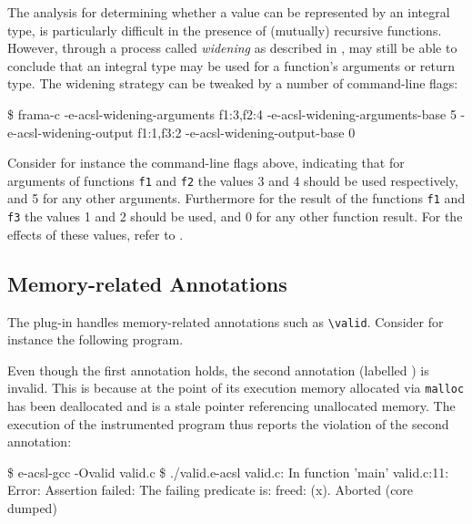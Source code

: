The analysis for determining whether a value can be represented by an integral \C
type, is particularly difficult in the presence of (mutually) recursive functions.
However, through a process called \emph{widening} as described in
\cite{benjamin23tap}, \eacsl may still be able to conclude that an integral \C
type may be used for a function's arguments or return type. The widening strategy
can be tweaked by a number of command-line flags:
\begin{frama-c-commands}
\$ frama-c -e-acsl-widening-arguments f1:3,f2:4
             -e-acsl-widening-arguments-base 5
             -e-acsl-widening-output f1:1,f3:2
             -e-acsl-widening-output-base 0
\end{frama-c-commands}
Consider for instance the command-line flags above, indicating that for arguments
of functions \lstinline|f1| and \lstinline|f2| the values 3 and 4 should be used
respectively, and 5 for any other arguments. Furthermore for the result of the
functions \lstinline|f1| and \lstinline|f3| the values 1 and 2 should be used, and
0 for any other function result. For the effects of these values, refer to
\cite{benjamin23tap}.


\subsection{Memory-related Annotations}
\label{sec:memory}

The \eacsl plug-in handles memory-related annotations such as
\lstinline|\valid|.  Consider for instance the following program.


Even though the first annotation holds, the second annotation (labelled
) is invalid. This is because at the point of its execution memory
allocated via \texttt{malloc} has been deallocated and  is a stale pointer
referencing unallocated memory.  The execution of the instrumented program thus
reports the violation of the second annotation:

\begin{logs}
\$ e-acsl-gcc -Ovalid valid.c
\$ ./valid.e-acsl
valid.c: In function 'main'
valid.c:11: Error: Assertion failed:
        The failing predicate is:
        freed: \valid(x).
Aborted (core dumped)
\end{logs}


